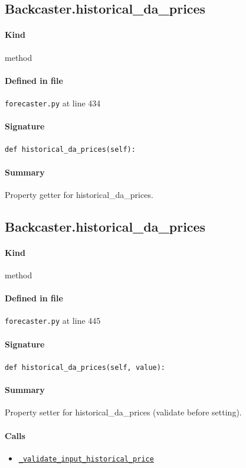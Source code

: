 \documentclass[11pt]{report}
\begin{document}
\subsection{Backcaster.historical\_da\_prices}
\label{def:forecaster.py:Backcaster.historical_da_prices:L434}
\paragraph{Kind} method
\paragraph{Defined in file} \texttt{forecaster.py} at line 434
\paragraph{Signature} \texttt{def historical\_da\_prices(self):}
\paragraph{Summary} Property getter for historical\_da\_prices.
\subsection{Backcaster.historical\_da\_prices}
\label{def:forecaster.py:Backcaster.historical_da_prices:L445}
\paragraph{Kind} method
\paragraph{Defined in file} \texttt{forecaster.py} at line 445
\paragraph{Signature} \texttt{def historical\_da\_prices(self, value):}
\paragraph{Summary} Property setter for historical\_da\_prices (validate before setting).
\paragraph{Calls}
\begin{itemize}[leftmargin=*]
  \item \hyperref[def:forecaster.py:Backcaster._validate_input_historical_price:L348]{\texttt{\_validate\_input\_historical\_price}}
\end{itemize}
\end{document}
